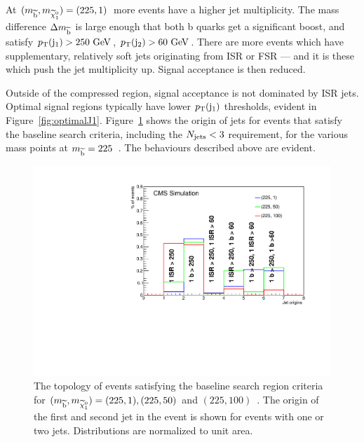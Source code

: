 At $(m_{\widetilde{{\rm b}}},m_{\widetilde{\chi}^{0}_{1}})=(225,1)$~\GeV more events have a higher jet multiplicity. 
The mass difference $\Delta m_{\widetilde{{\rm b}}}$ is large enough that both b quarks get a significant boost, and satisfy $p_{\text{T}}({\rm j}_1)>250~\mathrm{GeV}$, $p_{\text{T}}({\rm j}_2)>60~\mathrm{GeV}$. 
There are more events which have supplementary, relatively soft jets originating from \ac{ISR} or \ac{FSR} --- and it is these which push the jet multiplicity up. 
Signal acceptance is then reduced.

Outside of the compressed region, signal acceptance is not dominated by \ac{ISR} jets. Optimal signal regions typically have lower $p_{\text{T}}({\rm j}_1)$ thresholds, evident in Figure~\ref{fig:optimalJ1}.
Figure~\ref{fig:jetContent225} shows the origin of jets for events that satisfy the baseline search criteria, including the $N_{\text{jets}}<3$ requirement, for the various mass points at $m_{\widetilde{{\rm b}}}=225$~\GeV.
The behaviours described above are evident. 

\begin{figure}[!Hhtb]
  \begin{center}
  \includegraphics[scale=0.39]{Figures/sus13009/eventTypes_225.pdf}
  \caption{The topology of events satisfying the baseline search region criteria for $(m_{\widetilde{{\rm b}}}, m_{\widetilde{\chi}^{0}_{1}})=(225,1), (225,50)$ and $(225,100)$~\GeV. The origin of the first and second jet in the event is shown for events with one or two jets. Distributions are normalized to unit area.}
  \label{fig:jetContent225}
  \end{center}
\end{figure}

